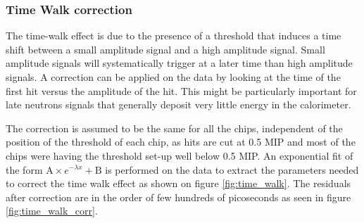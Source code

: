 \subsubsection{Time Walk correction}
\label{subsec:timewalk}

The time-walk effect is due to the presence of a threshold that induces a time shift between a small amplitude signal and a high amplitude signal. Small amplitude signals will systematically trigger at a later time than high amplitude signals. A correction can be applied on the data by looking at the time of the first hit versus the amplitude of the hit. This might be particularly important for late neutrons signals that generally deposit very little energy in the calorimeter.

The correction is assumed to be the same for all the chips, independent of the position of the threshold of each chip, as hits are cut at 0.5 MIP and most of the chips were having the threshold set-up well below 0.5 MIP. An exponential fit of the form $\text{A} \times e^{-\lambda{}x} + \text{B}$ is performed on the data to extract the parameters needed to correct the time walk effect as shown on figure \ref{fig:time_walk}. The residuals after correction are in the order of few hundreds of picoseconds as seen in figure \ref{fig:time_walk_corr}.

